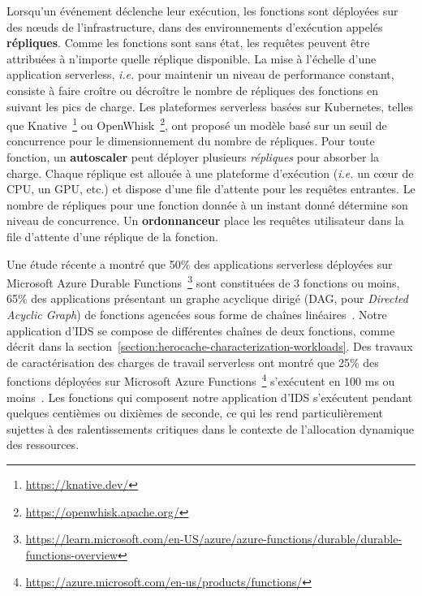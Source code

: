 Lorsqu'un événement déclenche leur exécution, les fonctions sont déployées sur des nœuds de l'infrastructure, dans des environnements d'exécution appelés \textbf{répliques}. Comme les fonctions sont sans état, les requêtes peuvent être attribuées à n'importe quelle réplique disponible. La mise à l'échelle d'une application serverless, \textit{i.e.} pour maintenir un niveau de performance constant, consiste à faire croître ou décroître le nombre de répliques des fonctions en suivant les pics de charge. Les plateformes serverless basées sur Kubernetes, telles que Knative~\footnote{\href{https://knative.dev/}{https://knative.dev/}} ou OpenWhisk~\footnote{\href{https://openwhisk.apache.org/}{https://openwhisk.apache.org/}}, ont proposé un modèle basé sur un seuil de concurrence pour le dimensionnement du nombre de répliques. Pour toute fonction, un \textbf{autoscaler} peut déployer plusieurs \textit{répliques} pour absorber la charge. Chaque réplique est allouée à une plateforme d'exécution (\textit{i.e.} un cœur de \gls{CPU}, un \gls{GPU}, etc.) et dispose d'une file d'attente pour les requêtes entrantes. Le nombre de répliques pour une fonction donnée à un instant donné détermine son niveau de concurrence. Un \textbf{ordonnanceur} place les requêtes utilisateur dans la file d'attente d'une réplique de la fonction.

Une étude récente a montré que 50\% des applications serverless déployées sur Microsoft Azure Durable Functions~\footnote{\href{https://learn.microsoft.com/en-US/azure/azure-functions/durable/durable-functions-overview}{https://learn.microsoft.com/en-US/azure/azure-functions/durable/durable-functions-overview}} sont constituées de 3 fonctions ou moins, 65\% des applications présentant un graphe acyclique dirigé (\gls{DAG}, pour \textit{Directed Acyclic Graph}) de fonctions agencées sous forme de chaînes linéaires~\cite{mahgoubORIONThreeRights}. Notre application d'\gls{IDS} se compose de différentes chaînes de deux fonctions, comme décrit dans la section~\ref{section:herocache-characterization-workloads}. Des travaux de caractérisation des charges de travail serverless ont montré que 25\% des fonctions déployées sur Microsoft Azure Functions~\footnote{\href{https://azure.microsoft.com/en-us/products/functions/}{https://azure.microsoft.com/en-us/products/functions/}} s'exécutent en 100 ms ou moins~\cite{shahradServerlessWildCharacterizing}. Les fonctions qui composent notre application d'\gls{IDS} s'exécutent pendant quelques centièmes ou dixièmes de seconde, ce qui les rend particulièrement sujettes à des ralentissements critiques dans le contexte de l'allocation dynamique des ressources.

